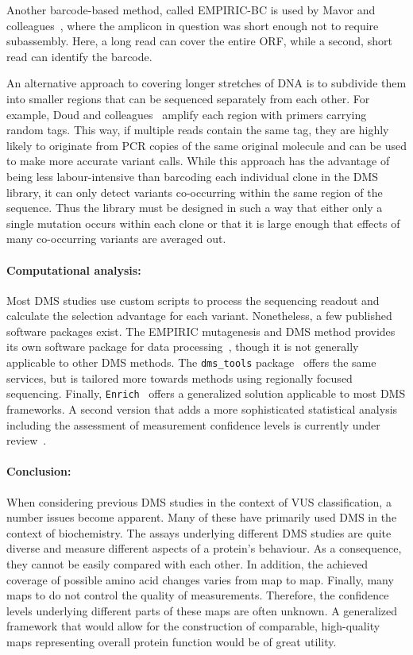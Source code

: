 Another barcode-based method, called EMPIRIC-BC is used by Mavor and colleagues~\cite{mavor_determination_2016}, where the amplicon in question was short enough not to require subassembly. Here, a long read can cover the entire ORF, while a second, short read can identify the barcode.

An alternative approach to covering longer stretches of DNA is to subdivide them into smaller regions that can be sequenced separately from each other. For example, Doud and colleagues~\cite{doud_accurate_2016} amplify each region with primers carrying random tags. This way, if multiple reads contain the same tag, they are highly likely to originate from PCR copies of the same original molecule and can be used to make more accurate variant calls. While this approach has the advantage of being less labour-intensive than barcoding each individual clone in the DMS library, it can only detect variants co-occurring within the same region of the sequence. Thus the library must be designed in such a way that either only a single mutation occurs within each clone or that it is large enough that effects of many co-occurring variants are averaged out.

\paragraph{Computational analysis:} Most DMS studies use custom scripts to process the sequencing readout and calculate the selection advantage for each variant. Nonetheless, a few published software packages exist. The EMPIRIC mutagenesis and DMS method provides its own software package for data processing~\cite{hietpas_experimental_2011}, though it is not generally applicable to other DMS methods. The \texttt{dms\_tools} package~\cite{bloom_software_2015} offers the same services, but is tailored more towards methods using regionally focused sequencing. Finally, \texttt{Enrich}~\cite{fowler_enrich:_2011} offers a generalized solution applicable to most DMS frameworks. A second version that adds a more sophisticated statistical analysis including the assessment of measurement confidence levels is currently under review~\cite{rubin_enrich2:_2016}.


\paragraph{Conclusion:} When considering previous DMS studies in the context of VUS classification, a number issues become apparent. Many of these have primarily used DMS in the context of biochemistry. The assays underlying different DMS studies are quite diverse and measure different aspects of a protein's behaviour. As a consequence, they cannot be easily compared with each other. In addition, the achieved coverage of possible amino acid changes varies from map to map. Finally, many maps to do not control the quality of measurements. Therefore, the confidence levels underlying different parts of these maps are often unknown. A generalized framework that would allow for the construction of comparable, high-quality maps representing overall protein function would be of great utility.

